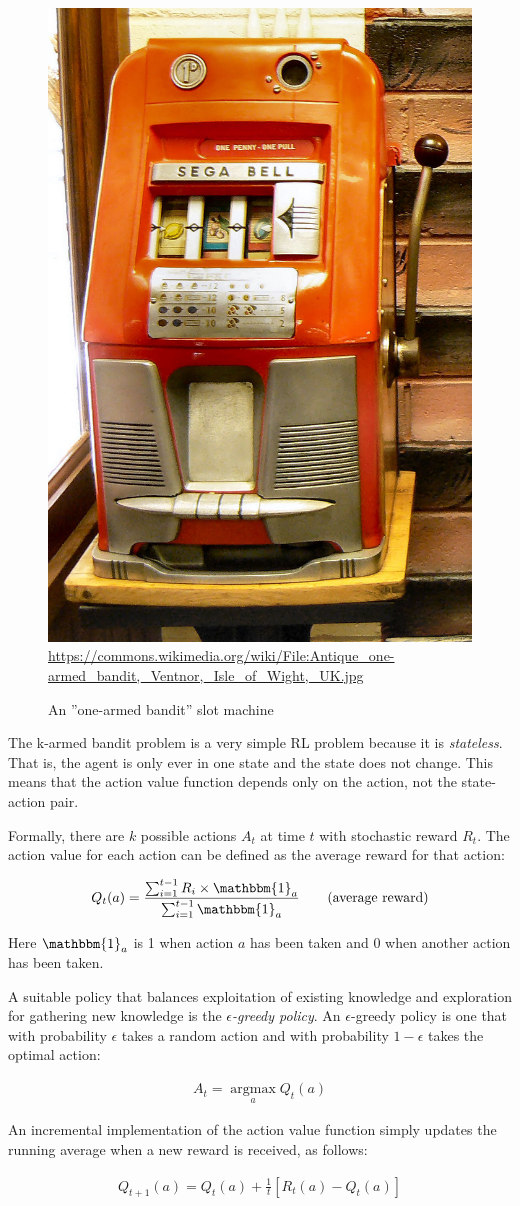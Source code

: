 \begin{figure}
\centering
\includegraphics[width=.25\textwidth]{one-armed_bandit.jpg}\\
\tiny \url{https://commons.wikimedia.org/wiki/File:Antique_one-armed_bandit,_Ventnor,_Isle_of_Wight,_UK.jpg}
\caption{An ''one-armed bandit'' slot machine}
\label{fig:bandit}
\end{figure}

The k-armed bandit problem is a very simple RL problem because it is \emph{stateless}. That is, the agent is only ever in one state and the state does not change. This means that the action value function depends only on the action, not the state-action pair.

Formally, there are $k$ possible actions $A_t$ at time $t$ with stochastic reward $R_t$. The action value for each action can be defined as the average reward for that action:

\begin{align*}
   Q_t(a) = \frac{\sum_{i=1}^{t-1} R_i \times \mathbbm{1}_a}{\sum_{i=1}^{t-1} \mathbbm{1}_a} \qquad \text{(average reward)}
\end{align*}

Here $\mathbbm{1}_a$ is 1 when action $a$ has been taken and 0 when another action has been taken. 

A suitable policy that balances exploitation of existing knowledge and exploration for gathering new knowledge is the \emph{$\epsilon$-greedy policy}. An $\epsilon$-greedy policy is one that with probability $\epsilon$ takes a random action and with probability $1-\epsilon$ takes the optimal action:

\begin{align*}
A_t = \operatorname*{arg max}_a Q_t(a)
\end{align*}

An incremental implementation of the action value function simply updates the running average when a new reward is received, as follows:

\begin{align}
Q_{t+1}(a) = Q_t(a) + \frac{1}{t}\left[R_t(a) - Q_t(a)\right] \label{eq:2}
\end{align}

